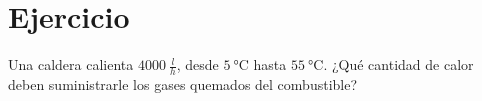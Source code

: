 \section{Ejercicio}\label{ej:Chap04Ejercicio08}
Una caldera calienta $\SI{4000}{\frac{l}{h}}$, desde $\SI{5}{\celsius}$ hasta $\SI{55}{\celsius}$. ¿Qué cantidad de calor deben suministrarle los gases quemados del combustible?